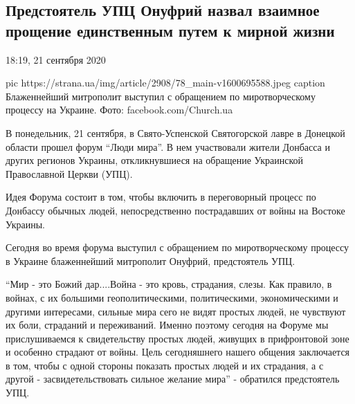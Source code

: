  
 
 
 
 
 
\subsection{Предстоятель УПЦ Онуфрий назвал взаимное прощение единственным путем к мирной жизни}
\label{sec:21_09_2020.news.ua.strana.1.onufrii_mir_upc}

18:19, 21 сентября 2020

\ifcmt
pic https://strana.ua/img/article/2908/78_main-v1600695588.jpeg
caption Блаженнейший митрополит выступил с обращением по миротворческому процессу на Украине. Фото: facebook.com/Church.ua
\fi


В понедельник, 21 сентября, в Свято-Успенской Святогорской лавре в
Донецкой области прошел форум \enquote{Люди мира}. В нем участвовали жители
Донбасса и других регионов Украины, откликнувшиеся на обращение Украинской
Православной Церкви (УПЦ).

Идея Форума состоит в том, чтобы включить в переговорный процесс по Донбассу
обычных людей, непосредственно пострадавших от войны на Востоке Украины.

Сегодня во время форума выступил с обращением по миротворческому процессу
в Украине блаженнейший митрополит Онуфрий, предстоятель УПЦ.

\enquote{Мир - это Божий дар....Война - это кровь, страдания, слезы. Как правило,
в войнах, с их большими геополитическими, политическими, экономическими и
другими интересами, сильные мира сего не видят простых людей, не чувствуют
их боли, страданий и переживаний. Именно поэтому сегодня на Форуме мы
прислушиваемся к свидетельству простых людей, живущих в прифронтовой зоне
и особенно страдают от войны. Цель сегодняшнего нашего общения заключается
в том, чтобы с одной стороны показать простых людей и их страдания, а с
другой - засвидетельствовать сильное желание мира} - обратился
предстоятель УПЦ.


